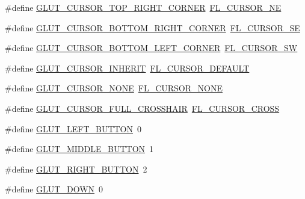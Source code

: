 \begin{DoxyCompactItemize}
\item 
\#define \hyperlink{glut_8_h_aa678faed809a40e29999796f0d5e7498}{G\+L\+U\+T\+\_\+\+C\+U\+R\+S\+O\+R\+\_\+\+T\+O\+P\+\_\+\+R\+I\+G\+H\+T\+\_\+\+C\+O\+R\+N\+ER}~\hyperlink{_enumerations_8_h_a72bde974edc7926b1217dd51b8c7e8e0ac6b21e75adf3bd782e3c4affe992ba33}{F\+L\+\_\+\+C\+U\+R\+S\+O\+R\+\_\+\+NE}
\item 
\#define \hyperlink{glut_8_h_a1bd3a12e71f61b89c1ea2f099048cdf0}{G\+L\+U\+T\+\_\+\+C\+U\+R\+S\+O\+R\+\_\+\+B\+O\+T\+T\+O\+M\+\_\+\+R\+I\+G\+H\+T\+\_\+\+C\+O\+R\+N\+ER}~\hyperlink{_enumerations_8_h_a72bde974edc7926b1217dd51b8c7e8e0a20e02baa5891403ea99e770525dcb906}{F\+L\+\_\+\+C\+U\+R\+S\+O\+R\+\_\+\+SE}
\item 
\#define \hyperlink{glut_8_h_ac3d56e72d9d67368344d00d2c4b11904}{G\+L\+U\+T\+\_\+\+C\+U\+R\+S\+O\+R\+\_\+\+B\+O\+T\+T\+O\+M\+\_\+\+L\+E\+F\+T\+\_\+\+C\+O\+R\+N\+ER}~\hyperlink{_enumerations_8_h_a72bde974edc7926b1217dd51b8c7e8e0ac556babff2b1387a1139f07c7361a8f5}{F\+L\+\_\+\+C\+U\+R\+S\+O\+R\+\_\+\+SW}
\item 
\#define \hyperlink{glut_8_h_aafa2626801284529c4d55007b47e20f4}{G\+L\+U\+T\+\_\+\+C\+U\+R\+S\+O\+R\+\_\+\+I\+N\+H\+E\+R\+IT}~\hyperlink{_enumerations_8_h_a72bde974edc7926b1217dd51b8c7e8e0a045f091aae5108f94e912bf5163344dd}{F\+L\+\_\+\+C\+U\+R\+S\+O\+R\+\_\+\+D\+E\+F\+A\+U\+LT}
\item 
\#define \hyperlink{glut_8_h_a8ba21c7c933925c5d9a1e64180c14023}{G\+L\+U\+T\+\_\+\+C\+U\+R\+S\+O\+R\+\_\+\+N\+O\+NE}~\hyperlink{_enumerations_8_h_a72bde974edc7926b1217dd51b8c7e8e0a4bc466fe5135272bccedd6b8f97156c7}{F\+L\+\_\+\+C\+U\+R\+S\+O\+R\+\_\+\+N\+O\+NE}
\item 
\#define \hyperlink{glut_8_h_af4d3eefea3797a4a06e652e90e17a938}{G\+L\+U\+T\+\_\+\+C\+U\+R\+S\+O\+R\+\_\+\+F\+U\+L\+L\+\_\+\+C\+R\+O\+S\+S\+H\+A\+IR}~\hyperlink{_enumerations_8_h_a72bde974edc7926b1217dd51b8c7e8e0a69ff20b8685ba12b6faef9f7f2565c91}{F\+L\+\_\+\+C\+U\+R\+S\+O\+R\+\_\+\+C\+R\+O\+SS}
\item 
\#define \hyperlink{glut_8_h_a889091fa01fbf2f7d4d6f86b5028b54b}{G\+L\+U\+T\+\_\+\+L\+E\+F\+T\+\_\+\+B\+U\+T\+T\+ON}~0
\item 
\#define \hyperlink{glut_8_h_a99af895d2ade59903d17dc05167fc2e9}{G\+L\+U\+T\+\_\+\+M\+I\+D\+D\+L\+E\+\_\+\+B\+U\+T\+T\+ON}~1
\item 
\#define \hyperlink{glut_8_h_ada993ed7a1ceee11b1c3326b8b15dbf3}{G\+L\+U\+T\+\_\+\+R\+I\+G\+H\+T\+\_\+\+B\+U\+T\+T\+ON}~2
\item 
\#define \hyperlink{glut_8_h_a30d72298588fe4f6204e9f6d86f955b3}{G\+L\+U\+T\+\_\+\+D\+O\+WN}~0

\end{DoxyCompactItemize}
